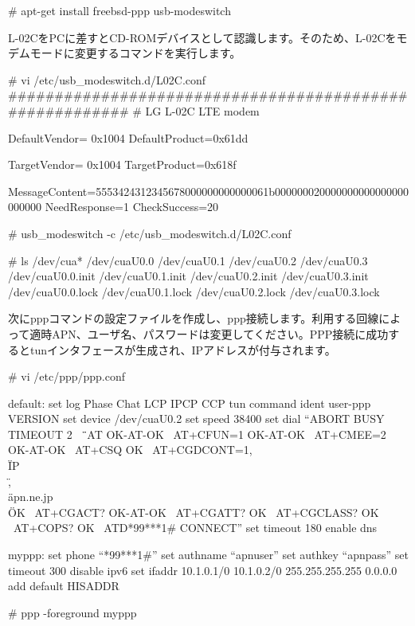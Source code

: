 \documentclass[mingoth,a4paper]{jsarticle}
\begin{document}
\begin{commandline}
  # apt-get install freebsd-ppp usb-modeswitch 
\end{commandline}

L-02CをPCに差すとCD-ROMデバイスとして認識します。そのため、L-02Cをモデムモードに変更するコマンドを実行します。

\begin{commandline}
  # vi /etc/usb_modeswitch.d/L02C.conf
  ########################################################
  # LG L-02C LTE modem

  DefaultVendor= 0x1004
  DefaultProduct=0x61dd

  TargetVendor= 0x1004
  TargetProduct=0x618f

  MessageContent=5553424312345678000000000000061b000000020000000000000000000000
  NeedResponse=1
  CheckSuccess=20

  # usb_modeswitch -c /etc/usb_modeswitch.d/L02C.conf
\end{commandline}

\begin{commandline}
  # ls /dev/cua*
  /dev/cuaU0.0       /dev/cuaU0.1       /dev/cuaU0.2       /dev/cuaU0.3
  /dev/cuaU0.0.init  /dev/cuaU0.1.init  /dev/cuaU0.2.init  /dev/cuaU0.3.init
  /dev/cuaU0.0.lock  /dev/cuaU0.1.lock  /dev/cuaU0.2.lock  /dev/cuaU0.3.lock
\end{commandline}

次にpppコマンドの設定ファイルを作成し、ppp接続します。利用する回線によって適時APN、ユーザ名、パスワードは変更してください。PPP接続に成功するとtunインタフェースが生成され、IPアドレスが付与されます。

\begin{commandline}
  # vi /etc/ppp/ppp.conf

  default:
    set log Phase Chat LCP IPCP CCP tun command
    ident user-ppp VERSION
    set device /dev/cuaU0.2
    set speed 38400
    set dial ``ABORT BUSY TIMEOUT 2 \
    \"\" \
    AT OK-AT-OK \
    AT+CFUN=1 OK-AT-OK \
    AT+CMEE=2 OK-AT-OK \
    AT+CSQ OK \
    AT+CGDCONT=1,\\\"IP\\\",\\\"apn.ne.jp\\\" OK \
    AT+CGACT? OK-AT-OK \
    AT+CGATT? OK \
    AT+CGCLASS? OK \
    AT+COPS? OK \
    ATD*99***1# CONNECT''
    set timeout 180
    enable dns

  myppp:
    set phone ``*99***1#''
    set authname ``apnuser''
    set authkey ``apnpass''
    set timeout 300
    disable ipv6
    set ifaddr 10.1.0.1/0 10.1.0.2/0 255.255.255.255 0.0.0.0
    add default HISADDR

  # ppp -foreground myppp
\end{commandline}
\end{document}
